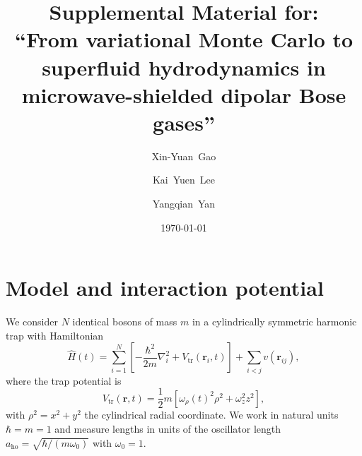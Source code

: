 \documentclass[aps,prl,onecolumn,superscriptaddress,longbibliography,nofootinbib]{revtex4-2}
\newcommand{\br}{\mathbf{r}}
\begin{document}
\title{Supplemental Material for:\\
``From variational Monte Carlo to superfluid hydrodynamics
in microwave-shielded dipolar Bose gases''}

\author{Xin-Yuan~Gao}
\author{Kai~Yuen~Lee}
\author{Yangqian~Yan}

\date{\today}

\maketitle

\setcounter{equation}{0}
\setcounter{figure}{0}
\setcounter{table}{0}
\setcounter{section}{0}
\renewcommand{\theequation}{S\arabic{equation}}
\renewcommand{\thefigure}{S\arabic{figure}}
\renewcommand{\thetable}{S\arabic{table}}
\renewcommand{\thesection}{S\arabic{section}}

\section{Model and interaction potential}
\label{sec:model}

We consider $N$ identical bosons of mass $m$ in a cylindrically symmetric
harmonic trap with Hamiltonian
\begin{equation}
\hat{H}(t) = \sum_{i=1}^N\!\left[
-\frac{\hbar^2}{2m}\nabla_i^2 + V_{\mathrm{tr}}(\br_i,t)\right]
+ \sum_{i<j} v(\br_{ij}),
\label{eq:H}
\end{equation}
where the trap potential is
\begin{equation}
V_{\mathrm{tr}}(\br,t) = \frac{1}{2}m\left[\omega_\rho(t)^2\rho^2
+ \omega_z^2 z^2\right],
\end{equation}
with $\rho^2 = x^2 + y^2$ the cylindrical radial coordinate.  We work
in natural units $\hbar=m=1$ and measure lengths in units of the
oscillator length $a_{\mathrm{ho}}=\sqrt{\hbar/(m\omega_0)}$ with
$\omega_0=1$.
\end{document}
